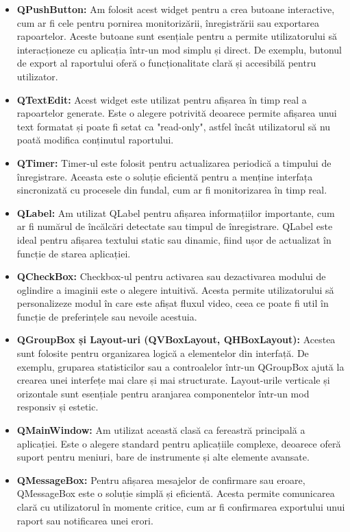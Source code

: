 \documentclass[12pt,a4paper]{article}
\begin{document}
\begin{itemize}
    \item \textbf{QPushButton:} Am folosit acest widget pentru a crea butoane interactive, cum ar fi cele pentru pornirea monitorizării, înregistrării sau exportarea rapoartelor. Aceste butoane sunt esențiale pentru a permite utilizatorului să interacționeze cu aplicația într-un mod simplu și direct. De exemplu, butonul de export al raportului oferă o funcționalitate clară și accesibilă pentru utilizator.

    \item \textbf{QTextEdit:} Acest widget este utilizat pentru afișarea în timp real a rapoartelor generate. Este o alegere potrivită deoarece permite afișarea unui text formatat și poate fi setat ca "read-only", astfel încât utilizatorul să nu poată modifica conținutul raportului.

    \item \textbf{QTimer:} Timer-ul este folosit pentru actualizarea periodică a timpului de înregistrare. Aceasta este o soluție eficientă pentru a menține interfața sincronizată cu procesele din fundal, cum ar fi monitorizarea în timp real.

    \item \textbf{QLabel:} Am utilizat QLabel pentru afișarea informațiilor importante, cum ar fi numărul de încălcări detectate sau timpul de înregistrare. QLabel este ideal pentru afișarea textului static sau dinamic, fiind ușor de actualizat în funcție de starea aplicației.

    \item \textbf{QCheckBox:} Checkbox-ul pentru activarea sau dezactivarea modului de oglindire a imaginii este o alegere intuitivă. Acesta permite utilizatorului să personalizeze modul în care este afișat fluxul video, ceea ce poate fi util în funcție de preferințele sau nevoile acestuia.

    \item \textbf{QGroupBox și Layout-uri (QVBoxLayout, QHBoxLayout):} Acestea sunt folosite pentru organizarea logică a elementelor din interfață. De exemplu, gruparea statisticilor sau a controalelor într-un QGroupBox ajută la crearea unei interfețe mai clare și mai structurate. Layout-urile verticale și orizontale sunt esențiale pentru aranjarea componentelor într-un mod responsiv și estetic.

    \item \textbf{QMainWindow:} Am utilizat această clasă ca fereastră principală a aplicației. Este o alegere standard pentru aplicațiile complexe, deoarece oferă suport pentru meniuri, bare de instrumente și alte elemente avansate.

    \item \textbf{QMessageBox:} Pentru afișarea mesajelor de confirmare sau eroare, QMessageBox este o soluție simplă și eficientă. Acesta permite comunicarea clară cu utilizatorul în momente critice, cum ar fi confirmarea exportului unui raport sau notificarea unei erori.
\end{itemize}
\end{document}
